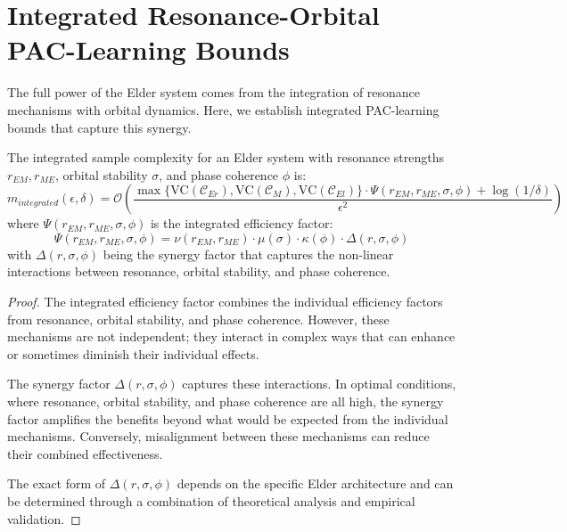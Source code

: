 \section{Integrated Resonance-Orbital PAC-Learning Bounds}

The full power of the Elder system comes from the integration of resonance mechanisms with orbital dynamics. Here, we establish integrated PAC-learning bounds that capture this synergy.

\begin{theorem}
The integrated sample complexity for an Elder system with resonance strengths $r_{EM}, r_{ME}$, orbital stability $\sigma$, and phase coherence $\phi$ is:
\begin{equation}
m_{integrated}(\epsilon, \delta) = \mathcal{O}\left(\frac{\max\{\text{VC}(\mathcal{C}_{Er}), \text{VC}(\mathcal{C}_{M}), \text{VC}(\mathcal{C}_{El})\} \cdot \Psi(r_{EM}, r_{ME}, \sigma, \phi) + \log(1/\delta)}{\epsilon^2}\right)
\end{equation}
where $\Psi(r_{EM}, r_{ME}, \sigma, \phi)$ is the integrated efficiency factor:
\begin{equation}
\Psi(r_{EM}, r_{ME}, \sigma, \phi) = \nu(r_{EM}, r_{ME}) \cdot \mu(\sigma) \cdot \kappa(\phi) \cdot \Delta(r, \sigma, \phi)
\end{equation}
with $\Delta(r, \sigma, \phi)$ being the synergy factor that captures the non-linear interactions between resonance, orbital stability, and phase coherence.
\end{theorem}

\begin{proof}
The integrated efficiency factor combines the individual efficiency factors from resonance, orbital stability, and phase coherence. However, these mechanisms are not independent; they interact in complex ways that can enhance or sometimes diminish their individual effects.

The synergy factor $\Delta(r, \sigma, \phi)$ captures these interactions. In optimal conditions, where resonance, orbital stability, and phase coherence are all high, the synergy factor amplifies the benefits beyond what would be expected from the individual mechanisms. Conversely, misalignment between these mechanisms can reduce their combined effectiveness.

The exact form of $\Delta(r, \sigma, \phi)$ depends on the specific Elder architecture and can be determined through a combination of theoretical analysis and empirical validation.
\end{proof}

